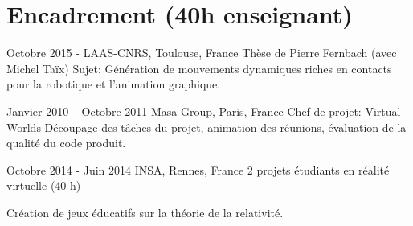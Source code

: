 \documentclass{tccv}
\begin{document}
\section{Encadrement (40h enseignant)}
\begin{eventlist}

\item{ Octobre 2015 - }
     {LAAS-CNRS, Toulouse, France}
     {Th\`ese de Pierre Fernbach (avec Michel Ta\"ix)}
     Sujet: G\'en\'eration de mouvements dynamiques riches en contacts
     pour la robotique et l'animation graphique.
     
\item{Janvier 2010 -- Octobre 2011}
     {Masa Group, Paris, France}
     {Chef de projet: Virtual Worlds}
D\'ecoupage des t\^aches du projet, animation des r\'eunions, 
\'evaluation de la qualit\'e du code produit.
     
\item{Octobre 2014 - Juin 2014}
     {INSA, Rennes, France}
     {2 projets \'etudiants en r\'ealit\'e virtuelle (40 h)}
     
     Cr\'eation de jeux \'educatifs sur la th\'eorie de la relativit\'e.


\end{eventlist}
\end{document}
